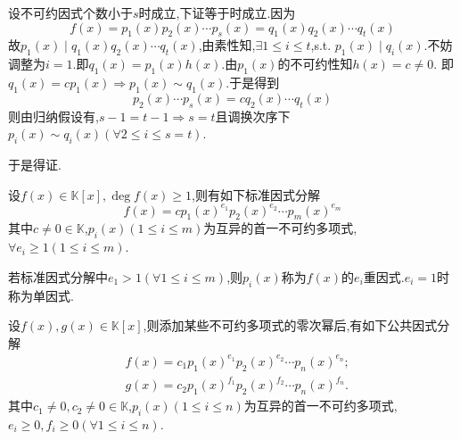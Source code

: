 \begin{formal}
\begin{Proof}
\begin{enumerate}[label={\textup{(\arabic*)}}]
    设不可约因式个数小于$s$时成立,下证等于时成立.因为\[
            f\left(x\right)=p_1\left(x\right)p_2\left(x\right)\cdots p_s\left(x\right)=q_1\left(x\right)q_2\left(x\right)\cdots q_t\left(x\right)
    \]
    故$p_1\left(x\right)\mid q_1\left(x\right)q_2\left(x\right)\cdots q_t\left(x\right)$,由素性知,$\exists 1\leqslant i\leqslant t$,\textup{s.t.}
    $p_1\left(x\right)\mid q_i\left(x\right).$不妨调整为$i=1$.即$q_1\left(x\right)=p_1\left(x\right)h\left(x\right).$由$p_1\left(x\right)$的不可约性知$h\left(x\right)=c\neq 0.$
    即$q_1\left(x\right)=cp_1\left(x\right)\Longrightarrow p_1\left(x\right)\sim q_1\left(x\right)$.于是得到
    \[
    p_2\left(x\right)\cdots p_s\left(x\right)=cq_2\left(x\right)\cdots q_t\left(x\right)
    \]
    则由归纳假设有,$s-1=t-1\Longrightarrow s=t$且调换次序下$p_i\left(x\right)\sim q_i\left(x\right)\left(\forall 2\leqslant i \leqslant s=t\right)$.

    于是得证.\qedhere
    \end{enumerate}
\end{Proof}
\end{formal}
\begin{green}
\begin{corollary}[标准因式分解]\label{cor:标准因式分解}
    设$f\left(x\right)\in\mathbb{K}\left[x\right],\deg f\left(x\right)\geqslant 1$,则有如下标准因式分解
    \[
    f\left(x\right)=cp_1\left(x\right)^{e_1}p_2\left(x\right)^{e_2}\cdots p_m\left(x\right)^{e_m}
    \]
    其中$c\neq 0\in\mathbb{K}$,$p_i\left(x\right)\left(1\leqslant i\leqslant m\right)$为互异的首一不可约多项式,$\forall e_i\geqslant 1\left(1\leqslant i\leqslant m\right)$.
\end{corollary}
\end{green}
\begin{formal}
\begin{definition}[重因式]\label{def:重因式}
    若标准因式分解中$e_1>1\left(\forall 1\leqslant i\leqslant m\right)$,则$p_i\left(x\right)$称为$f\left(x\right)$的$e_i$重因式.$e_i=1$时称为单因式.
\end{definition}
\end{formal}
\begin{green}
\begin{corollary}[公共因式分解]\label{cor:公共因式分解}
    设$f\left(x\right),g\left(x
    \right)\in\mathbb{K}\left[x\right]$,则添加某些不可约多项式的零次幂后,有如下公共因式分解
    \begin{align*}
        &f\left(x\right)=c_1p_1\left(x\right)^{e_1}p_2\left(x\right)^{e_2}\cdots p_n\left(x\right)^{e_n};
        \\
        &g\left(x\right)=c_2p_1\left(x\right)^{f_1}p_2\left(x\right)^{f_2}\cdots p_n\left(x\right)^{f_n}.
    \end{align*}
    其中$c_1\neq 0,c_2\neq 0\in\mathbb{K}$,$p_i\left(x\right)\left(1\leqslant i\leqslant n\right)$为互异的首一不可约多项式,$e_i\geqslant 0,f_i\geqslant 0\left(\forall 1\leqslant i\leqslant n\right)$.
\end{corollary}
\end{green}
